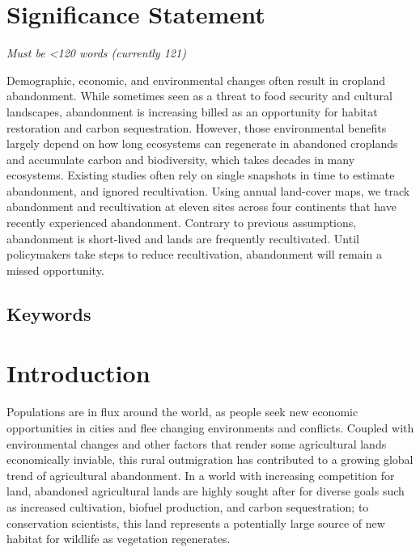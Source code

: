 \documentclass[
]{article}
\begin{document}
\hypertarget{significance-statement}{%
\section{Significance Statement}\label{significance-statement}}

\emph{Must be \textless120 words (currently 121)}

Demographic, economic, and environmental changes often result in cropland abandonment.
While sometimes seen as a threat to food security and cultural landscapes, abandonment is increasing billed as an opportunity for habitat restoration and carbon sequestration.
However, those environmental benefits largely depend on how long ecosystems can regenerate in abandoned croplands and accumulate carbon and biodiversity, which takes decades in many ecosystems.
Existing studies often rely on single snapshots in time to estimate abandonment, and ignored recultivation.
Using annual land-cover maps, we track abandonment and recultivation at eleven sites across four continents that have recently experienced abandonment.
Contrary to previous assumptions, abandonment is short-lived and lands are frequently recultivated.
Until policymakers take steps to reduce recultivation, abandonment will remain a missed opportunity.

\hypertarget{keywords}{%
\subsection{Keywords}\label{keywords}}

\hypertarget{introduction}{%
\section{Introduction}\label{introduction}}

Populations are in flux around the world, as people seek new economic opportunities in cities and flee changing environments and conflicts.
Coupled with environmental changes and other factors that render some agricultural lands economically inviable, this rural outmigration has contributed to a growing global trend of agricultural abandonment.
In a world with increasing competition for land, abandoned agricultural lands are highly sought after for diverse goals such as increased cultivation, biofuel production, and carbon sequestration; to conservation scientists, this land represents a potentially large source of new habitat for wildlife as vegetation regenerates.
\end{document}

